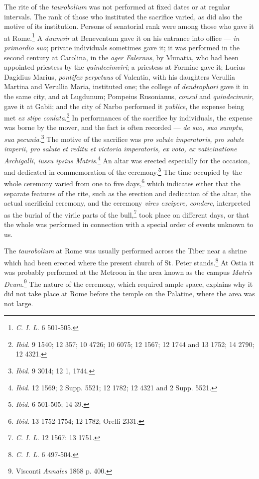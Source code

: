 \documentclass[a4paper, 11pt, oneside, polutonikogreek, french]{article}
\begin{document}
The rite of the \emph{taurobolium} was not performed at fixed dates or at regular intervals. The rank of those who instituted the sacrifice varied, as did also the motive of its institution. Persons of senatorial rank were among those who gave it at Rome.\footnote{\emph{C. I. L.} 6 501-505.} A \emph{duumvir} at Beneventum gave it on his entrance into office --- \emph{in primordio suo}; private individuals sometimes gave it; it was performed in the second century at Carolina, in the \emph{ager Falernus}, by Munatia, who had been appointed priestess by the \emph{quindecimviri}; a priestess at Formiae gave it; Lucius Dagidius Marius, \emph{pontifex perpetuus} of Valentia, with his daughters Verullia Martina and Verullia Maria, instituted one; the college of \emph{dendrophori} gave it in the same city, and at Lugdunum; Pompeius Rusonianus, \emph{consul} and \emph{quindecimvir}, gave it at Gabii; and the city of Narbo performed it \emph{publice}, the expense being met \emph{ex stipe conlata}.\footnote{\emph{Ibid.} 9 1540; 12 357; 10 4726; 10 6075; 12 1567; 12 1744 and 13 1752; 14 2790; 12 4321.} In performances of the sacrifice by individuals, the expense was borne by the mover, and the fact is often recorded --- \emph{de suo, suo sumptu, sua pecunia}.\footnote{\emph{Ibid.} 9 3014; 12 1, 1744.} The motive of the sacrifice was \emph{pro salute imperatoris, pro salute imperii, pro salute et reditu et victoria imperatoris, ex voto, ex vaticinatione Archigalli, iussu ipsius Matris}.\footnote{\emph{Ibid.} 12 1569; 2 Supp. 5521; 12 1782; 12 4321 and 2 Supp. 5521.} An altar was erected especially for the occasion, and dedicated in commemoration of the ceremony.\footnote{\emph{Ibid.} 6 501-505; 14 39.} The time occupied by the whole ceremony varied from one to five days,\footnote{\emph{Ibid.} 13 1752-1754; 12 1782; Orelli 2331.} which indicates either that the separate features of the rite, such as the erection and dedication of the altar, the actual sacrificial ceremony, and the ceremony \emph{vires excipere, condere}, interpreted as the burial of the virile parts of the bull,\footnote{\emph{C. I. L.} 12 1567: 13 1751.} took place on different days, or that the whole was performed in connection with a special order of events unknown to us.

The \emph{taurobolium} at Rome was usually performed across the Tiber near a shrine which had been erected where the present church of St. Peter stands.\footnote{\emph{C. I. L.} 6 497-504.} At Ostia it was probably performed at the Metroon in the area known as the campus \emph{Matris Deum}.\footnote{Visconti \emph{Annales} 1868 p. 400.} The nature of the ceremony, which required ample space, explains why it did not take place at Rome before the temple on the Palatine, where the area was not large.
\end{document}
